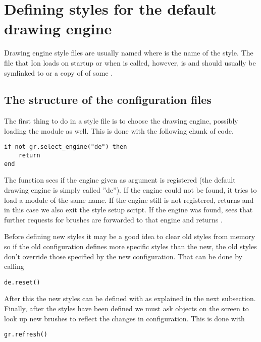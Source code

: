 \section{Defining styles for the default drawing engine}
\label{sec:defaultde}

Drawing engine style files are usually named
 where  is the name of the
style. The file that Ion loads on startup or when
 is called, however, is 
and should usually be symlinked to or a copy of of some
.

\subsection{The structure of the configuration files}

The first thing to do in a style file is to choose the drawing
engine, possibly loading the module as well. This is done
with the following chunk of code.

\begin{verbatim}
if not gr.select_engine("de") then 
    return 
end
\end{verbatim}

The  function sees if the engine
given as argument is registered (the default drawing engine is
simply called ''de''). If the engine could not be found, it
tries to load a module of the same name. If the engine still
is not registered,  returns 
and in this case we also exit the style setup script.
If the engine was found,  sees that
further requests for brushes are forwarded to that engine
and returns .

Before defining new styles it may be a good idea to clear old
styles from memory so if the old configuration defines more
specific styles than the new, the old styles don't override 
those specified by the new configuration. That can be done by
calling

\begin{verbatim}
de.reset()
\end{verbatim}

After this the new styles can be defined with 
as explained in the next subsection. Finally, after the styles have
been defined we must ask objects on the screen to look up new brushes
to reflect the changes in configuration. This is done with

\begin{verbatim}
gr.refresh()
\end{verbatim}

